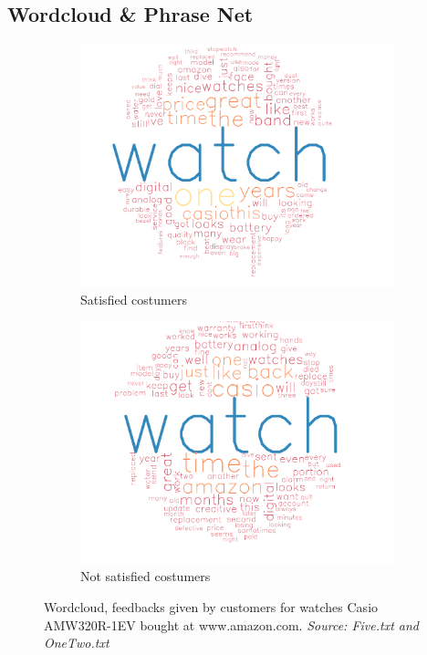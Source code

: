 \documentclass[11pt]{article}
\begin{document}
\subsection*{Wordcloud \& Phrase Net}


\begin{figure}[H]
  \begin{subfigure}[h]{0.5\textwidth}
    \includegraphics[width=\textwidth]{fivedata_wordcloud_mod.pdf}
    \caption{Satisfied costumers}
    \label{fig:five}
  \end{subfigure}
  \begin{subfigure}[h]{0.5\textwidth}
    \includegraphics[width=\textwidth]{onetwo_wordcloud_mod.pdf}
    \caption{Not satisfied costumers}
    \label{fig:one_two}
  \end{subfigure}
  \caption{Wordcloud, feedbacks given by customers for watches Casio AMW320R-1EV bought at www.amazon.com. \textit{Source: Five.txt and OneTwo.txt}}
\end{figure}
\end{document}
